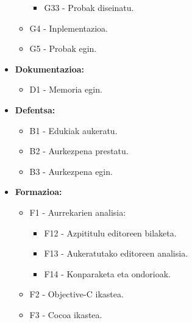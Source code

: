 \begin{itemize}
\begin{itemize}
\begin{itemize}
		\item G33 - Probak diseinatu.
		\end{itemize}
	\item G4 - Inplementazioa.
	\item G5 - Probak egin.
	\end{itemize}
\item \textbf{Dokumentazioa:}
	\begin{itemize}
	\item D1 - Memoria egin.
	\end{itemize}
\item \textbf{Defentsa:}
	\begin{itemize}
	\item B1 - Edukiak aukeratu.
	\item B2 - Aurkezpena prestatu.
	\item B3 - Aurkezpena egin.
	\end{itemize}
\item \textbf{Formazioa:}
	\begin{itemize}
	\item F1 - Aurrekarien analisia:
		\begin{itemize}
		\item F12 - Azpititulu editoreen bilaketa.
		\item F13 - Aukeratutako editoreen analisia.
		\item F14 - Konparaketa eta ondorioak.
		\end{itemize}
	\item F2 - Objective-C ikastea.
	\item F3 - Cocoa ikastea.
	\end{itemize}
\end{itemize}

